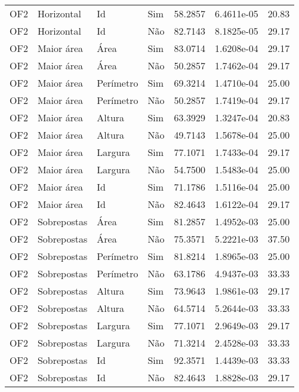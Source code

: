 \begin{tabular}{llllrrr}
    OF2       & Horizontal  & Id        & Sim         & 58.2857      & 6.4611e-05 & 20.83    \\
    OF2       & Horizontal  & Id        & Não         & 82.7143      & 8.1825e-05 & 29.17    \\
    OF2       & Maior área  & Área      & Sim         & 83.0714      & 1.6208e-04 & 29.17    \\
    OF2       & Maior área  & Área      & Não         & 50.2857      & 1.7462e-04 & 29.17    \\
    OF2       & Maior área  & Perímetro & Sim         & 69.3214      & 1.4710e-04 & 25.00    \\
    OF2       & Maior área  & Perímetro & Não         & 50.2857      & 1.7419e-04 & 29.17    \\
    OF2       & Maior área  & Altura    & Sim         & 63.3929      & 1.3247e-04 & 20.83    \\
    OF2       & Maior área  & Altura    & Não         & 49.7143      & 1.5678e-04 & 25.00    \\
    OF2       & Maior área  & Largura   & Sim         & 77.1071      & 1.7433e-04 & 29.17    \\
    OF2       & Maior área  & Largura   & Não         & 54.7500      & 1.5483e-04 & 25.00    \\
    OF2       & Maior área  & Id        & Sim         & 71.1786      & 1.5116e-04 & 25.00    \\
    OF2       & Maior área  & Id        & Não         & 82.4643      & 1.6122e-04 & 29.17    \\
    OF2       & Sobrepostas & Área      & Sim         & 81.2857      & 1.4952e-03 & 25.00    \\
    OF2       & Sobrepostas & Área      & Não         & 75.3571      & 5.2221e-03 & 37.50    \\
    OF2       & Sobrepostas & Perímetro & Sim         & 81.8214      & 1.8965e-03 & 25.00    \\
    OF2       & Sobrepostas & Perímetro & Não         & 63.1786      & 4.9437e-03 & 33.33    \\
    OF2       & Sobrepostas & Altura    & Sim         & 73.9643      & 1.9861e-03 & 29.17    \\
    OF2       & Sobrepostas & Altura    & Não         & 64.5714      & 5.2644e-03 & 33.33    \\
    OF2       & Sobrepostas & Largura   & Sim         & 77.1071      & 2.9649e-03 & 29.17    \\
    OF2       & Sobrepostas & Largura   & Não         & 71.3214      & 2.4528e-03 & 33.33    \\
    OF2       & Sobrepostas & Id        & Sim         & 92.3571      & 1.4439e-03 & 33.33    \\
    OF2       & Sobrepostas & Id        & Não         & 82.4643      & 1.8828e-03 & 29.17    \\
    \hline
\end{tabular}